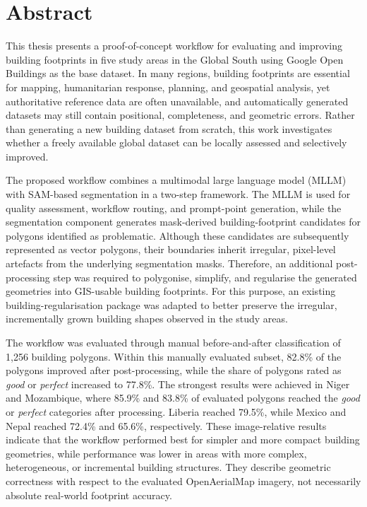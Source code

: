 \chapter*{Abstract}\thispagestyle{rmplain}
\label{05_abstract}
This thesis presents a proof-of-concept workflow for evaluating and improving building footprints in five study areas in the Global South using Google Open Buildings as the base dataset. In many regions, building footprints are essential for mapping, humanitarian response, planning, and geospatial analysis, yet authoritative reference data are often unavailable, and automatically generated datasets may still contain positional, completeness, and geometric errors. Rather than generating a new building dataset from scratch, this work investigates whether a freely available global dataset can be locally assessed and selectively improved.

The proposed workflow combines a multimodal large language model (MLLM) with SAM-based segmentation in a two-step framework. The MLLM is used for quality assessment, workflow routing, and prompt-point generation, while the segmentation component generates mask-derived building-footprint candidates for polygons identified as problematic. Although these candidates are subsequently represented as vector polygons, their boundaries inherit irregular, pixel-level artefacts from the underlying segmentation masks. Therefore, an additional post-processing step was required to polygonise, simplify, and regularise the generated geometries into GIS-usable building footprints. For this purpose, an existing building-regularisation package was adapted to better preserve the irregular, incrementally grown building shapes observed in the study areas.


The workflow was evaluated through manual before-and-after classification of 1,256 building polygons. Within this manually evaluated subset, 82.8\% of the polygons improved after post-processing, while the share of polygons rated as \textit{good} or \textit{perfect} increased to 77.8\%. The strongest results were achieved in Niger and Mozambique, where 85.9\% and 83.8\% of evaluated polygons reached the \textit{good} or \textit{perfect} categories after processing. Liberia reached 79.5\%, while Mexico and Nepal reached 72.4\% and 65.6\%, respectively. These image-relative results indicate that the workflow performed best for simpler and more compact building geometries, while performance was lower in areas with more complex, heterogeneous, or incremental building structures. They describe geometric correctness with respect to the evaluated OpenAerialMap imagery, not necessarily absolute real-world footprint accuracy.

